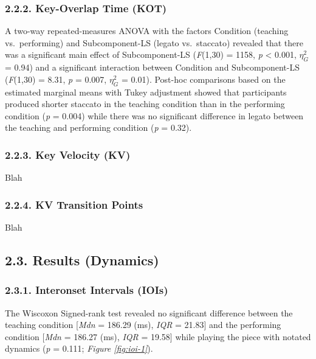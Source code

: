 \documentclass[
  english,
  man,floatsintext]{apa6}
\begin{document}
\hypertarget{key-overlap-time-kot}{%
\subsubsection{2.2.2. Key-Overlap Time (KOT)}\label{key-overlap-time-kot}}

A two-way repeated-measures ANOVA with the factors Condition (teaching vs.~performing) and Subcomponent-LS (legato vs.~staccato) revealed that there was a significant main effect of Subcomponent-LS (\emph{F}(1,30) = 1158, \emph{p} \textless{} 0.001, \(\eta_G^2\) = 0.94) and a significant interaction between Condition and Subcomponent-LS (\emph{F}(1,30) = 8.31, \emph{p} = 0.007, \(\eta_G^2\) = 0.01). Post-hoc comparisons based on the estimated marginal means with Tukey adjustment showed that participants produced shorter staccato in the teaching condition than in the performing condition (\emph{p} = 0.004) while there was no significant difference in legato between the teaching and performing condition (\emph{p} = 0.32).

\hypertarget{key-velocity-kv}{%
\subsubsection{2.2.3. Key Velocity (KV)}\label{key-velocity-kv}}

Blah

\hypertarget{kv-transition-points}{%
\subsubsection{2.2.4. KV Transition Points}\label{kv-transition-points}}

Blah

\hypertarget{results-dynamics}{%
\subsection{2.3. Results (Dynamics)}\label{results-dynamics}}

\hypertarget{interonset-intervals-iois-1}{%
\subsubsection{2.3.1. Interonset Intervals (IOIs)}\label{interonset-intervals-iois-1}}

The Wiscoxon Signed-rank test revealed no significant difference between the teaching condition {[}\emph{Mdn} = 186.29 (ms), \emph{IQR} = 21.83{]} and the performing condition {[}\emph{Mdn} = 186.27 (ms), \emph{IQR} = 19.58{]} while playing the piece with notated dynamics (\emph{p} = 0.111; \emph{Figure \ref{fig:ioi-1}}).
\end{document}
